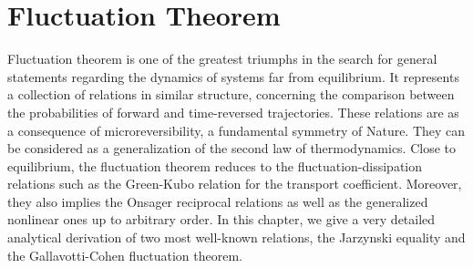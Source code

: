 \chapter{Fluctuation Theorem}\label{chap:FT}


\par Fluctuation theorem is one of the greatest triumphs in the search for general statements regarding the dynamics of systems far from equilibrium. It represents a collection of relations in similar structure, concerning the comparison between the probabilities of forward and time-reversed trajectories. These relations are as a consequence of microreversibility, a fundamental symmetry of Nature. They can be considered as a generalization of the second law of thermodynamics. Close to equilibrium, the fluctuation theorem reduces to the fluctuation-dissipation relations such as the Green-Kubo relation for the transport coefficient. Moreover, they also implies the Onsager reciprocal relations as well as the generalized nonlinear ones up to arbitrary order. In this chapter, we give a very detailed analytical derivation of two most well-known relations, the Jarzynski equality and the Gallavotti-Cohen fluctuation theorem.















